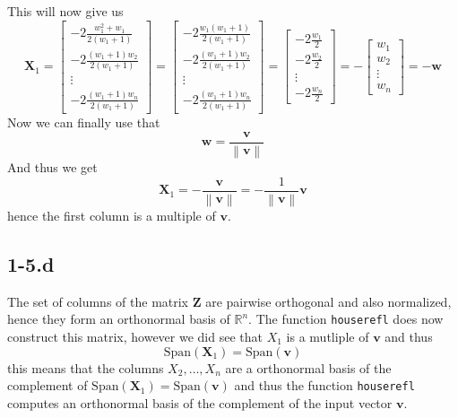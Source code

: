 \documentclass{article}
\begin{document}
This will now give us
\begin{equation*}
    \mathbf{X}_{1} = \begin{bmatrix}
   - 2\frac{w_{1}^{2} + w_{1}}{2\left(w_{1} + 1\right)} \\[1mm]
      - 2\frac{\left(w_{1} + 1\right)w_{2}}{2\left(w_{1} + 1\right)} \\[1mm]
      \vdots \\
      - 2\frac{\left(w_{1} + 1\right)w_{n}}{2\left(w_{1} + 1\right)}
   \end{bmatrix} = 
   \begin{bmatrix}
   - 2\frac{w_{1}\left(w_{1} +1\right)}{2\left(w_{1} + 1\right)} \\[1mm]
      - 2\frac{\left(w_{1} + 1\right)w_{2}}{2\left(w_{1} + 1\right)} \\[1mm]
      \vdots \\
      - 2\frac{\left(w_{1} + 1\right)w_{n}}{2\left(w_{1} + 1\right)}
   \end{bmatrix} = 
   \begin{bmatrix}
   - 2\frac{w_{1}}{2} \\[1mm]
      - 2\frac{w_{2}}{2} \\[1mm]
      \vdots \\
      - 2\frac{w_{n}}{2}
   \end{bmatrix}
   = - \begin{bmatrix}
       w_{1} \\ w_{2} \\ \vdots \\ w_{n}
   \end{bmatrix} = -\mathbf{w}
\end{equation*}
Now we can finally use that
\begin{equation*}
    \mathbf{w} = \frac{\mathbf{v}}{\left\lVert \mathbf{v}\right\rVert}
\end{equation*}
And thus we get
\begin{equation*}
    \mathbf{X}_{1} = -\frac{\mathbf{v}}{\left\lVert \mathbf{v}\right\rVert} = -\frac{1}{\left\lVert \mathbf{v}\right\rVert}\mathbf{v}
\end{equation*}
hence the first column is a multiple of $\mathbf{v}$.
\subsection*{1-5.d}
The set of columns of the matrix $\mathbf{Z}$ are pairwise orthogonal and also normalized, hence they form an orthonormal basis of $\mathbb{R}^{n}$. The function \verb|houserefl| does now construct this matrix, however we did see that $X_{1}$ is a mutliple of $\mathbf{v}$ and thus
\begin{equation*}
    \text{Span}\left(\mathbf{X}_{1}\right) = \text{Span}\left(\mathbf{v}\right)
\end{equation*}
this means that the columns $X_{2}, \dots, X_{n}$ are a orthonormal basis  of the complement of $\text{Span}\left(\mathbf{X}_{1}\right) = \text{Span}\left(\mathbf{v}\right)$
and thus the function \verb|houserefl| computes an orthonormal basis of the complement of the input vector $\mathbf{v}$.
\end{document}
